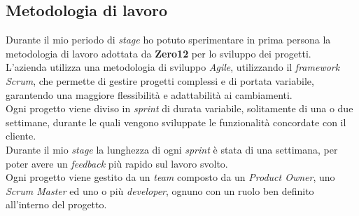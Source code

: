 \subsection{Metodologia di lavoro}
\label{sez:metodologia-lavoro}

Durante il mio periodo di \textit{stage} ho potuto sperimentare in prima persona la metodologia di lavoro adottata da \textbf{Zero12} per lo sviluppo dei progetti.\\
L'azienda utilizza una metodologia di sviluppo \textit{Agile}, utilizzando il \textit{framework} \textit{Scrum}, che permette di gestire progetti complessi e di portata variabile,
garantendo una maggiore flessibilità e adattabilità ai cambiamenti.\\
Ogni progetto viene diviso in \textit{sprint} di durata variabile, solitamente di una o due settimane, durante le quali vengono sviluppate le funzionalità concordate con il cliente.\\
Durante il mio \textit{stage} la lunghezza di ogni \textit{sprint} è stata di una settimana, per poter avere un \textit{feedback} più rapido sul lavoro svolto.\\
Ogni progetto viene gestito da un \textit{team} composto da un \textit{Product Owner}, uno \textit{Scrum Master} ed uno o più \textit{developer}, ognuno con un ruolo ben definito all'interno del progetto.\\

